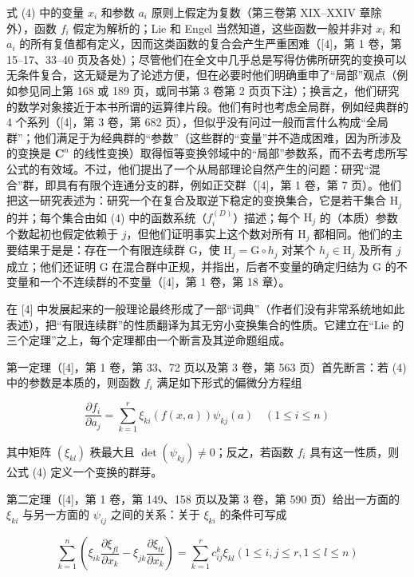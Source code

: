 式 (4) 中的变量 \(x_{i}\) 和参数 \(a_{i}\) 原则上假定为复数（第三卷第 XIX--XXIV 章除外），函数 \(f_{i}\) 假定为解析的；Lie 和 Engel 当然知道，这些函数一般并非对 \(x_{i}\) 和 \(a_{i}\) 的所有复值都有定义，因而这类函数的复合会产生严重困难（{[}4{]}，第 1 卷，第 15--17、33--40 页及各处）；尽管他们在全文中几乎总是写得仿佛所研究的变换可以无条件复合，这无疑是为了论述方便，但在必要时他们明确重申了“局部”观点（例如参见同上第 168 或 189 页，或同书第 3 卷第 2 页页下注）；换言之，他们研究的数学对象接近于本书所谓的运算律片段。他们有时也考虑全局群，例如经典群的 4 个系列（{[}4{]}，第 3 卷，第 682 页），但似乎没有问过一般而言什么构成“全局群”；他们满足于为经典群的“参数”（这些群的“变量”并不造成困难，因为所涉及的变换是 \(\mathbf{C}^n\) 的线性变换）取得恒等变换邻域中的“局部”参数系，而不去考虑所写公式的有效域。不过，他们提出了一个从局部理论自然产生的问题：研究“混合”群，即具有有限个连通分支的群，例如正交群（{[}4{]}，第 1 卷，第 7 页）。他们把这一研究表述为：研究一个在复合及取逆下稳定的变换集合，它是若干集合 \(\mathrm{H}_j\) 的并；每个集合由如 (4) 中的函数系统（\(f_i^{(D)}\)）描述；每个 \(\mathrm{H}_j\) 的（本质）参数个数起初也假定依赖于 \(j\)，但他们证明事实上这个数对所有 \(\mathrm{H}_j\) 都相同。他们的主要结果于是是：存在一个有限连续群 G，使 \(\mathrm{H}_j = \mathrm{G} \circ h_j\) 对某个 \(h_j \in \mathrm{H}_j\) 及所有 \(j\) 成立；他们还证明 G 在混合群中正规，并指出，后者不变量的确定归结为 G 的不变量和一个不连续群的不变量（{[}4{]}，第 1 卷，第 18 章）。

在 {[}4{]} 中发展起来的一般理论最终形成了一部“词典”（作者们没有非常系统地如此表述），把“有限连续群”的性质翻译为其无穷小变换集合的性质。它建立在“Lie 的三个定理”之上，每个定理都由一个断言及其逆命题组成。

第一定理（{[}4{]}，第 1 卷，第 33、72 页以及第 3 卷，第 563 页）首先断言：若 (4) 中的参数是本质的，则函数 \(f_{i}\) 满足如下形式的偏微分方程组

\[
\frac {\partial f _ {i}}{\partial a _ {j}} = \sum_ {k = 1} ^ {r} \xi_ {k i} (f (x, a)) \psi_ {k j} (a) \quad (1 \leqslant i \leqslant n)\tag{15}
\]

其中矩阵 \((\xi_{kl})\) 秩最大且 \(\det(\psi_{kj}) \neq 0\)；反之，若函数 \(f_{i}\) 具有这一性质，则公式 (4) 定义一个变换的群芽。

第二定理（{[}4{]}，第 1 卷，第 149、158 页以及第 3 卷，第 590 页）给出一方面的 \(\xi_{ki}\) 与另一方面的 \(\psi_{ij}\) 之间的关系：关于 \(\xi_{ki}\) 的条件可写成

\[
\sum_ {k = 1} ^ {n} \left(\xi_ {i k} \frac {\partial \xi_ {f l}}{\partial x _ {k}} - \xi_ {j k} \frac {\partial \xi_ {t l}}{\partial x _ {k}}\right) = \sum_ {k = 1} ^ {r} c _ {i j} ^ {k} \xi_ {k l} (1 \leqslant i, j \leqslant r, 1 \leqslant l \leqslant n)\tag{16}
\]

